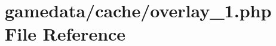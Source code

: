 \hypertarget{cache_2overlay__1_8php}{\section{gamedata/cache/overlay\+\_\+1.php File Reference}
\label{cache_2overlay__1_8php}
}
